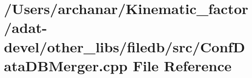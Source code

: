 \hypertarget{adat-devel_2other__libs_2filedb_2src_2ConfDataDBMerger_8cpp}{}\section{/\+Users/archanar/\+Kinematic\+\_\+factor/adat-\/devel/other\+\_\+libs/filedb/src/\+Conf\+Data\+D\+B\+Merger.cpp File Reference}
\label{adat-devel_2other__libs_2filedb_2src_2ConfDataDBMerger_8cpp}
